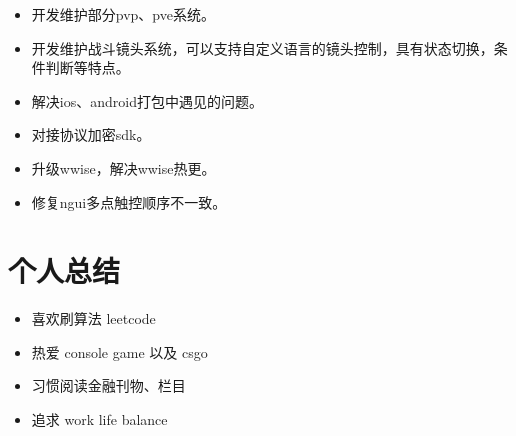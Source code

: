 \documentclass{resume}
\begin{document}
\begin{itemize}
  \item 开发维护部分pvp、pve系统。
  \item 开发维护战斗镜头系统，可以支持自定义语言的镜头控制，具有状态切换，条件判断等特点。
  \item 解决ios、android打包中遇见的问题。
  \item 对接协议加密sdk。
  \item 升级wwise，解决wwise热更。
  \item 修复ngui多点触控顺序不一致。
\end{itemize}


\section{个人总结}
\begin{itemize}[parsep=0.2ex]
  \item 喜欢刷算法 leetcode
  \item 热爱 console game 以及 csgo
  \item 习惯阅读金融刊物、栏目
  \item 追求 work life balance
\end{itemize}

%
%
\end{document}
